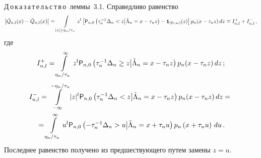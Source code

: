 \noindent
Д\,о\,к\,а\,з\,а\,т\,е\,л\,ь\,с\,т\,в\,о~леммы~3.1. Справедливо равенство
\begin{equation*}
\left|\bar Q_{n,l}(x)-\tilde Q_{n,l}(x) \right|
=\int\limits_{|z|\geq\eta_n/\tau_n} z^{l}\left[
{{\sf P}}_{n,0}\left(\tau_n^{-1}\Delta_n < z\big| \tilde\Lambda_n=x-\tau_nz\right)-
{\mbox{{\small \tt {1}}\hspace{-1.5mm}{\tt 1}}}_{(0,\infty)}(z)\right]
p_n(x-\tau_nz)\,dz\equiv
I_{n,l}^+ +I_{n,l}^-\,,
\end{equation*}
где
\begin{equation}
I_{n,l}^+=\int\limits_{\eta_n/\tau_n}^{\infty} z^{l} {{\sf P}}_{n,0}
\left(\tau_n^{-1}\Delta_n \geq z \big| \tilde\Lambda_n=x-\tau_nz\right) p_n(x-\tau_nz)\,dz\,;\label{e4.1}
\end{equation}
\begin{multline}
I_{n,l}^-=\int\limits_{-\infty}^{-\eta_n/\tau_n} |z|^{l} 
{{\sf P}}_{n,0}\left(\tau_n^{-1}\Delta_n < z\big| \tilde\Lambda_n=x-\tau_nz\right)p_n(x-\tau_nz)\,dz={}\\
{}
=\int\limits_{\eta_n/\tau_n}^{\infty} u^{l} {{\sf P}}_{n,0}\left(
-\tau_n^{-1}\Delta_n > u\big| \tilde\Lambda_n=x+\tau_nu\right) p_n\left(x+\tau_nu\right)\,du\,.
\label{e4.2}
\end{multline}
Последнее равенство получено из предшествующего путем замены $z=u$.

